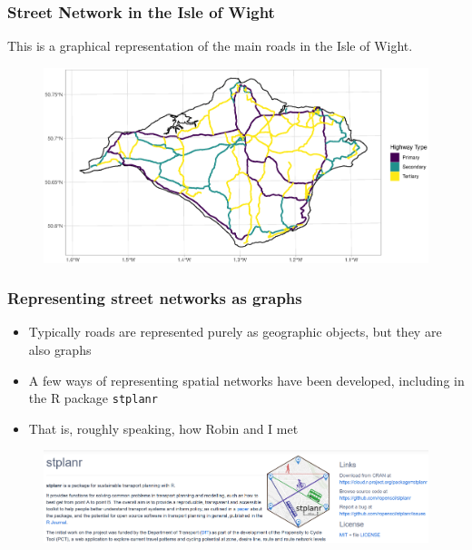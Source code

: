 \documentclass[c,10pt,pdftex]{beamer}
\begin{document}
\begin{frame}
\frametitle{Street Network in the Isle of Wight}
This is a graphical representation of the main roads in the Isle of Wight. 
\vspace{-0.75cm}
\begin{figure}
\centering
\includegraphics[width = 1.05\linewidth]{images/highway_type}
\end{figure}
\end{frame}

\begin{frame}
  \frametitle{Representing street networks as graphs}
  \vspace{-0.75cm}
  \begin{itemize}
    \setlength\itemsep{1em}
    \item Typically roads are represented purely as geographic objects, but they are also \alert{graphs}
    \item A few ways of representing spatial networks have been developed, including in the R package \texttt{stplanr}
    \item That is, roughly speaking, how Robin and I met
  \end{itemize}
  \begin{figure}
  	\centering
  	\includegraphics[width = 1.05\linewidth]{images/stplanr-wide-screenshot}
  \end{figure}	
\end{frame}

% 
\end{document}
